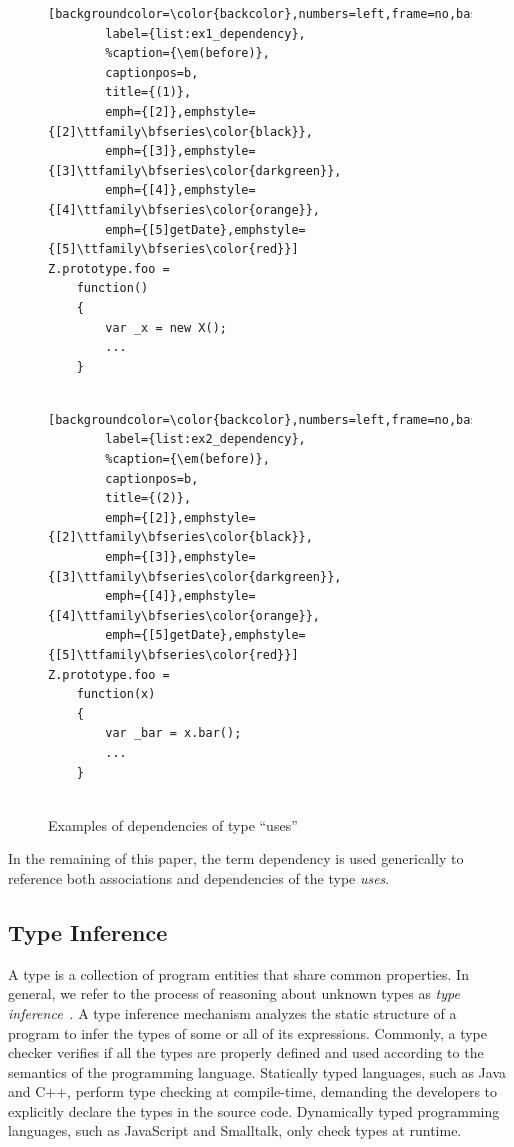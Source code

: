 \documentclass[review]{elsarticle}
\newcommand{\aspas}[1]{{``#1''}}
\begin{document}
\begin{figure}[ht]
	\centering
	\begin{minipage}{.35\textwidth}
		\begin{lstlisting}[backgroundcolor=\color{backcolor},numbers=left,frame=no,basicstyle=\ttfamily\footnotesize,xleftmargin=5pt,
		label={list:ex1_dependency},
		%caption={\em(before)},
		captionpos=b,
		title={(1)},
		emph={[2]},emphstyle={[2]\ttfamily\bfseries\color{black}},
		emph={[3]},emphstyle={[3]\ttfamily\bfseries\color{darkgreen}},
		emph={[4]},emphstyle={[4]\ttfamily\bfseries\color{orange}},
		emph={[5]getDate},emphstyle={[5]\ttfamily\bfseries\color{red}}]
Z.prototype.foo = 
	function() 
	{
		var _x = new X();
		...
	}  
		
		\end{lstlisting}
	\end{minipage}
	\hspace{1pt}
	\begin{minipage}{.40\textwidth}
		\begin{lstlisting}[backgroundcolor=\color{backcolor},numbers=left,frame=no,basicstyle=\ttfamily\footnotesize,xleftmargin=5pt,
		label={list:ex2_dependency},
		%caption={\em(before)},
		captionpos=b,
		title={(2)},
		emph={[2]},emphstyle={[2]\ttfamily\bfseries\color{black}},
		emph={[3]},emphstyle={[3]\ttfamily\bfseries\color{darkgreen}},
		emph={[4]},emphstyle={[4]\ttfamily\bfseries\color{orange}},
		emph={[5]getDate},emphstyle={[5]\ttfamily\bfseries\color{red}}]
Z.prototype.foo = 
	function(x) 
	{
		var _bar = x.bar();
		...
	}
		
		\end{lstlisting}
	\end{minipage}
	
	\centering\caption{Examples of dependencies of type \aspas{uses}}
	\label{fig:example-dependencies}
\end{figure}


In the remaining of this paper, the term dependency is used generically to reference both associations and dependencies of the type \textit{uses}.


\subsection{Type Inference}
\label{subsec:type-inference}

A type is a collection of program entities that share common properties. In general, we refer to the process of reasoning about unknown types as \textit{type inference}~\cite{Palsberg:1991}. A type inference mechanism analyzes the static structure of a program to infer the types of some or all of its expressions. Commonly, a type checker verifies if all the types are properly defined and used according to the semantics of the programming language. Statically typed languages, such as Java and C++, perform type checking at compile-time, demanding the developers to explicitly declare the types in the source code. Dynamically typed programming languages, such as JavaScript and Smalltalk, only check types at runtime. 
\end{document}
